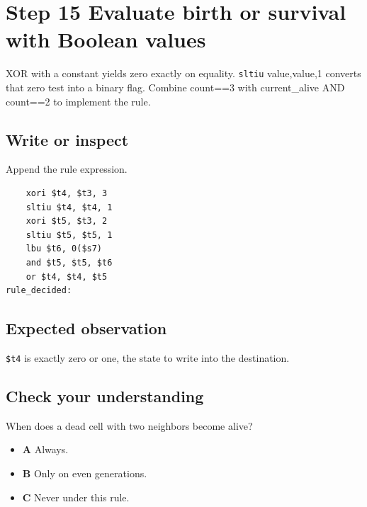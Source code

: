 \section{Step 15 Evaluate birth or survival with Boolean
  values}\label{008-life-generations-s15-step-15-evaluate-birth-or-survival-with-boolean-values}

XOR with a constant yields zero exactly on equality. \texttt{sltiu}
value,value,1 converts that zero test into a binary flag. Combine
count==3 with current\_alive AND count==2 to implement the rule.

\subsection{Write or
  inspect}\label{008-life-generations-s15-write-or-inspect}

Append the rule expression.

\begin{verbatim}
    xori $t4, $t3, 3
    sltiu $t4, $t4, 1
    xori $t5, $t3, 2
    sltiu $t5, $t5, 1
    lbu $t6, 0($s7)
    and $t5, $t5, $t6
    or $t4, $t4, $t5
rule_decided:
\end{verbatim}

\subsection{Expected
  observation}\label{008-life-generations-s15-expected-observation}

\texttt{\$t4} is exactly zero or one, the state to write into the
destination.

\subsection{Check your
  understanding}\label{008-life-generations-s15-check-your-understanding}

When does a dead cell with two neighbors become alive?

\begin{itemize}
  \tightlist
  \item
        \textbf{A} Always.
  \item
        \textbf{B} Only on even generations.
  \item
        \textbf{C} Never under this rule.
\end{itemize}
